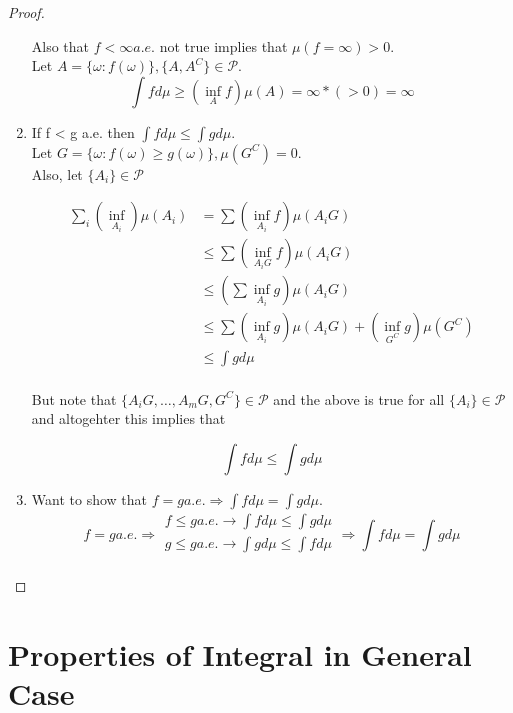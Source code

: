 \documentclass[11pt,fleqn]{book} %
\begin{document}
\begin{proof}
\begin{enumerate}
		Also that $f < \infty a.e.$ not true implies that $\mu(f = \infty) > 0$.\\

		Let $A = \{\omega: f (\omega)\}, \{A, A^C\} \in \mathcal{P}$. \\

				$$\int f d\mu \geq (\inf_A f ) \mu(A) = \infty * (> 0) = \infty $$

		\item If f < g a.e. then $\int f d\mu \leq \int g d\mu$.\\

		Let $G = \{\omega: f(\omega) \geq g(\omega) \}, \mu(G^C) = 0$.\\

		Also, let $\{A_i\} \in \mathcal{P}$

				\begin{align*}
				 	\sum_i (\inf_{A_i})\mu(A_i) &= \sum(\inf_{A_i} f) \mu(A_i G)\\
				 			&\leq \sum(\inf_{A_i G} f) \mu(A_i G)\\
				 			&\leq (\sum\inf_{A_i} g) \mu(A_i G)\\
				 			& \leq \sum(\inf_{A_i} g) \mu(A_i G) + (\inf_{G^C} g) \mu(G^C)\\
				 			&\leq \int g d\mu\\
				 \end{align*} 

		But note that $\{A_i G, \dots, A_m G, G^C\} \in \mathcal{P}$ and the above is true for all $\{A_i\} \in \mathcal{P}$ and altogehter this implies that

				$$\int f d\mu \leq \int g d\mu $$

		\item Want to show that $f = g a.e. \Rightarrow \int f d\mu = \int g d\mu$.\\


				$$f = g a.e. \Rightarrow \begin{array}{l}
					f \leq g a.e. \rightarrow \int f d\mu \leq \int g d\mu\\
					g \leq g a.e. \rightarrow \int g d\mu \leq \int f d\mu\\
				\end{array}  \Rightarrow \int f d\mu = \int g d\mu$$
	\end{enumerate}
\end{proof}

\section{Properties of Integral in General Case}
\end{document}
